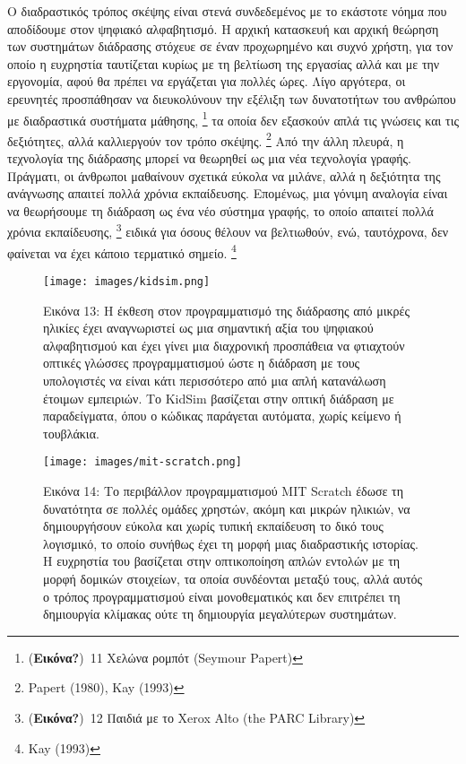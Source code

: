 \documentclass[
]{article}
\begin{document}
Ο διαδραστικός τρόπος σκέψης είναι στενά συνδεδεμένος με το εκάστοτε
νόημα που αποδίδουμε στον ψηφιακό αλφαβητισμό. Η αρχική κατασκευή και
αρχική θεώρηση των συστημάτων διάδρασης στόχευε σε έναν προχωρημένο και
συχνό χρήστη, για τον οποίο η ευχρηστία ταυτίζεται κυρίως με τη βελτίωση
της εργασίας αλλά και με την εργονομία, αφού θα πρέπει να εργάζεται για
πολλές ώρες. Λίγο αργότερα, οι ερευνητές προσπάθησαν να διευκολύνουν την
εξέλιξη των δυνατοτήτων του ανθρώπου με διαδραστικά συστήματα μάθησης,
\footnote{(\textbf{Εικόνα?})~11 Χελώνα ρομπότ (Seymour Papert)} τα οποία
δεν εξασκούν απλά τις γνώσεις και τις δεξιότητες, αλλά καλλιεργούν τον
τρόπο σκέψης. \footnote{Papert (1980), Kay (1993)} Από την άλλη πλευρά,
η τεχνολογία της διάδρασης μπορεί να θεωρηθεί ως μια νέα τεχνολογία
γραφής. Πράγματι, οι άνθρωποι μαθαίνουν σχετικά εύκολα να μιλάνε, αλλά η
δεξιότητα της ανάγνωσης απαιτεί πολλά χρόνια εκπαίδευσης. Επομένως, μια
γόνιμη αναλογία είναι να θεωρήσουμε τη διάδραση ως ένα νέο σύστημα
γραφής, το οποίο απαιτεί πολλά χρόνια εκπαίδευσης, \footnote{(\textbf{Εικόνα?})~12
  Παιδιά με το Xerox Alto (the PARC Library)} ειδικά για όσους θέλουν να
βελτιωθούν, ενώ, ταυτόχρονα, δεν φαίνεται να έχει κάποιο τερματικό
σημείο. \footnote{Kay (1993)}

\leavevmode{}%
\begin{figure}
\hypertarget{fig:kidsim}{%
\centering
\texttt{[image: images/kidsim.png]}
\caption{Εικόνα 13: Η έκθεση στον προγραμματισμό της διάδρασης από
μικρές ηλικίες έχει αναγνωριστεί ως μια σημαντική αξία του ψηφιακού
αλφαβητισμού και έχει γίνει μια διαχρονική προσπάθεια να φτιαχτούν
οπτικές γλώσσες προγραμματισμού ώστε η διάδραση με τους υπολογιστές να
είναι κάτι περισσότερο από μια απλή κατανάλωση έτοιμων εμπειριών. Το
KidSim βασίζεται στην οπτική διάδραση με παραδείγματα, όπου ο κώδικας
παράγεται αυτόματα, χωρίς κείμενο ή τουβλάκια.}\label{fig:kidsim}
}
\end{figure}

\leavevmode{}%
\begin{figure}
\hypertarget{fig:mit-scratch}{%
\centering
\texttt{[image: images/mit-scratch.png]}
\caption{Εικόνα 14: Το περιβάλλον προγραμματισμού MIT Scratch έδωσε τη
δυνατότητα σε πολλές ομάδες χρηστών, ακόμη και μικρών ηλικιών, να
δημιουργήσουν εύκολα και χωρίς τυπική εκπαίδευση το δικό τους λογισμικό,
το οποίο συνήθως έχει τη μορφή μιας διαδραστικής ιστορίας. Η ευχρηστία
του βασίζεται στην οπτικοποίηση απλών εντολών με τη μορφή δομικών
στοιχείων, τα οποία συνδέονται μεταξύ τους, αλλά αυτός ο τρόπος
προγραμματισμού είναι μονοθεματικός και δεν επιτρέπει τη δημιουργία
κλίμακας ούτε τη δημιουργία μεγαλύτερων
συστημάτων.}\label{fig:mit-scratch}
}
\end{figure}
\end{document}
